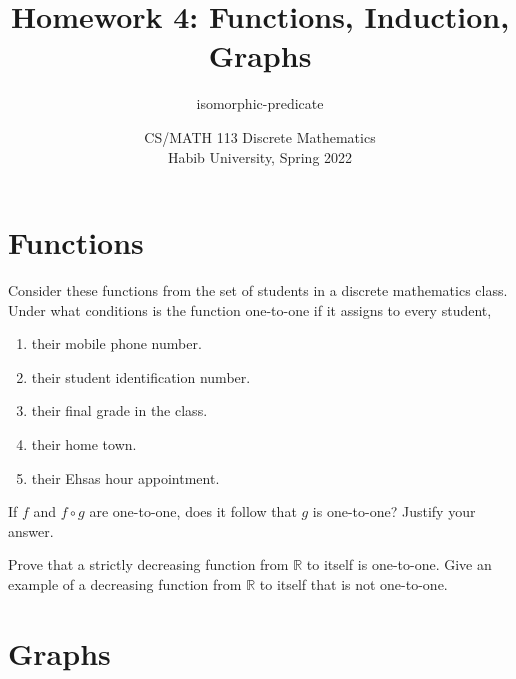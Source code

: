 \documentclass[addpoints]{exam}
\title{Homework 4: Functions, Induction, Graphs}
\author{isomorphic-predicate}  %
\date{CS/MATH 113 Discrete Mathematics\\Habib University, Spring 2022}
\begin{document}
\maketitle

\begin{questions}

  \section*{Functions}
  
\question[5] Consider these functions from the set of students in a discrete mathematics class. Under what conditions is the
  function one-to-one if it assigns to every student,
  
  \begin{enumerate}[label=\alph*)]
  \item their mobile phone number.
    \begin{solution}
    \end{solution}
  \item their student identification number.
    \begin{solution}
    \end{solution}
  \item their final grade in the class.
    \begin{solution}
    \end{solution}
  \item their home town.
    \begin{solution}
    \end{solution}
  \item their Ehsas hour appointment.
    \begin{solution}
    \end{solution}
  \end{enumerate}


\question[5] If $f$ and $f \circ g$ are one-to-one, does it follow that $g$ is one-to-one? Justify your answer.
  \begin{solution}
  \end{solution}

\question[5] Prove that a strictly decreasing function from $\mathbb{R}$ to itself is one-to-one. Give an example of a decreasing function from $\mathbb{R}$ to itself that is not one-to-one.
  \begin{solution}
  \end{solution}
  
  \section*{Graphs}
  

\end{questions}
\end{document}
